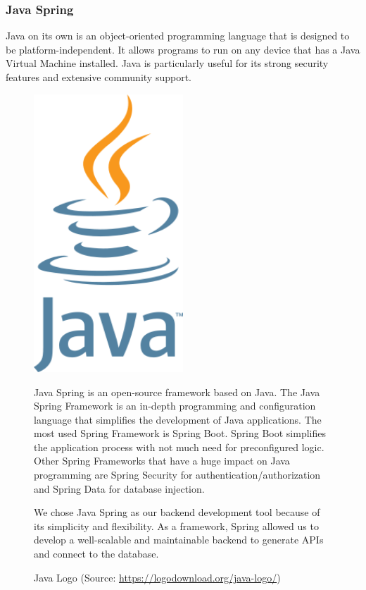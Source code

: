 \Author{\daAuthorThree}

\subsubsection{Java Spring}

Java on its own is an object-oriented programming language that is designed to be platform-independent. It allows programs to run on any device that has a Java Virtual Machine installed. Java is particularly useful for its strong security features and extensive community support.

\blankLine 

\begin{figure}[H]
    \centering
    \begin{minipage}{0.35\textwidth}
        \center
        \includegraphics [width=0.5\textwidth] {images/Technologies/javaLogo.png}
        \caption{Java Logo (Source: \url{https://logodownload.org/java-logo/})}
    \end{minipage}
    \hfill
    \begin{minipage}{0.6\textwidth}
      \setlength{\baselineskip}{1.5em}
      \vspace{-1em}
      Java Spring is an open-source framework based on Java. The Java Spring Framework is an in-depth programming and configuration language that simplifies the development of Java applications. The most used Spring Framework is Spring Boot. Spring Boot simplifies the application process with not much need for preconfigured logic. Other Spring Frameworks that have a huge impact on Java programming are Spring Security for authentication/authorization and Spring Data for database injection. 
      
      We chose Java Spring as our backend development tool because of its simplicity and flexibility. As a framework, Spring allowed us to develop a well-scalable and maintainable backend to generate APIs and connect to the database.       
    \end{minipage}
\end{figure}
